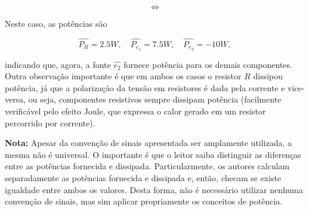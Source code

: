 \documentclass{article}
\numberwithin{equation}{section}
\newlength\Colsep
\begin{document}
\begin{center}
\noindent\begin{minipage}{0.8\textwidth}
\begin{minipage}[c][5cm][c]{\dimexpr0.45\textwidth-0.5\Colsep\relax}
    \begin{center}
    \end{center}
\end{minipage} \hfill
\begin{minipage}[c][5cm][c]{\dimexpr0.1\textwidth-0.5\Colsep\relax}
    $$\iff$$
\end{minipage} \hfill
\begin{minipage}[c][5cm][c]{\dimexpr0.45\textwidth-0.5\Colsep\relax}
    \begin{center}
    \end{center}
\end{minipage}
\end{minipage}
\end{center}

\noindent Neste caso, as potências são

$$ \widehat{P_R} = 2.5W, \quad \widehat{P_{e_1}} = 7.5W, \quad \widehat{P_{e_2}} = -10W,$$

\noindent indicando que, agora, a fonte $\widehat{e_2}$ fornece potência para os demais componentes. Outra observação importante é que em ambos os casos o resistor $R$ dissipou potência, já que a polarização da tensão em resistores é dada pela corrente e vice-versa, ou seja, componentes resistivos sempre dissipam potência (facilmente verificável pelo efeito Joule, que expressa o calor gerado em um resistor percorrido por corrente).

\textbf{Nota:} Apesar da convenção de sinais apresentada ser amplamente utilizada, a mesma não é universal. O importante é que o leitor saiba distinguir as diferenças entre as potências fornecida e dissipada. Particularmente, os autores calculam separadamente as potências fornecida e dissipada e, então, checam se existe igualdade entre ambos os valores. Desta forma, não é necessário utilizar nenhuma convenção de sinais, mas sim aplicar propriamente os conceitos de potência.
\end{document}
